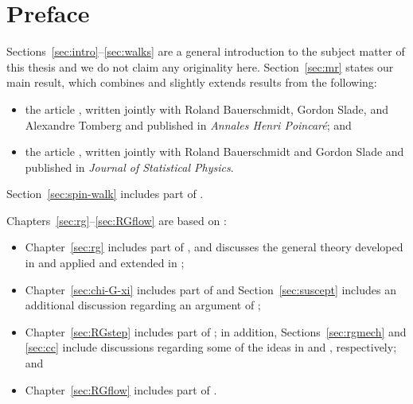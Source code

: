 \cleardoublepage

\chapter{Preface}

Sections~\ref{sec:intro}--\ref{sec:walks} are a general introduction to the
subject matter of this thesis and we do not claim any originality here. Section~\ref{sec:mr}
states our main result, which combines and slightly extends results from the following:
\begin{itemize}
\item
the article \cite{BSTW-clp}, written jointly with
Roland Bauerschmidt, Gordon Slade, and Alexandre Tomberg and
published in \textit{Annales Henri Poincar\'{e}};
and

\item
the article \cite{BSW-saw-sa}, written jointly with
Roland Bauerschmidt and Gordon Slade and published
in \textit{Journal of Statistical Physics}.
\end{itemize}
Section~\ref{sec:spin-walk} includes part of \cite{BSW-saw-sa}.

Chapters~\ref{sec:rg}--\ref{sec:RGflow} are based on \cite{BSTW-clp,BSW-saw-sa}:
\begin{itemize}
\item
Chapter~\ref{sec:rg} includes part of \cite{BSTW-clp,BSW-saw-sa},
and discusses the general theory developed in
\cite{BS-rg-norm,BS-rg-loc,BBS-rg-pt,BS-rg-IE,BS-rg-step}
and applied and extended in
\cite{BBS-saw4-log,BBS-saw4,ST-phi4};

\item
Chapter~\ref{sec:chi-G-xi} includes part of \cite{BSTW-clp,BSW-saw-sa}
and Section~\ref{sec:suscept} includes an additional discussion regarding an argument
of \cite{BBS-saw4-log};

\item
Chapter~\ref{sec:RGstep} includes part of \cite{BSTW-clp}; in addition,
Sections~\ref{sec:rgmech} and \ref{sec:cc} include discussions regarding some of the ideas in
\cite{BS-rg-step} and \cite{BS-rg-loc}, respectively; and

\item
Chapter~\ref{sec:RGflow} includes part of \cite{BSW-saw-sa}.
\end{itemize}

\cleardoublepage

\tableofcontents                  %

\cleardoublepage

